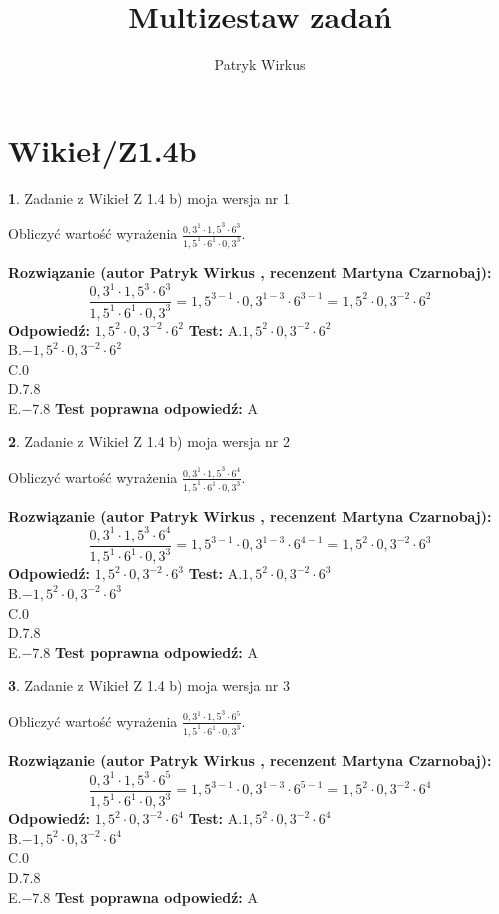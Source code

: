 \documentclass[12pt, a4paper]{article}
\title{Multizestaw zadań}
\author{Patryk Wirkus}
\date{}
\theoremstyle{definition} %
\newtheorem{zad}{}
\newcommand{\kategoria}[1]{\section{#1}}
\newcommand{\zadStart}[1]{\begin{zad}#1\newline}
\newcommand{\zadStop}{\end{zad}}
\newcommand{\rozwStart}[2]{\noindent \textbf{Rozwiązanie (autor #1 , recenzent #2): }\newline}
\newcommand{\rozwStop}{\newline}
\newcommand{\odpStart}{\noindent \textbf{Odpowiedź:}\newline}
\newcommand{\odpStop}{\newline}
\newcommand{\testStart}{\noindent \textbf{Test:}\newline}
\newcommand{\testStop}{\newline}
\newcommand{\kluczStart}{\noindent \textbf{Test poprawna odpowiedź:}\newline}
\newcommand{\kluczStop}{\newline}
\begin{document}
\maketitle

\kategoria{Wikieł/Z1.4b}


\zadStart{Zadanie z Wikieł Z 1.4 b) moja wersja nr 1}

Obliczyć wartość wyrażenia $\frac{0,3^{1}\cdot1,5^{3}\cdot6^{3}}{1,5^{1}\cdot6^{1}\cdot0,3^{3}}$.
\zadStop
\rozwStart{Patryk Wirkus}{Martyna Czarnobaj}
$$\frac{0,3^{1}\cdot1,5^{3}\cdot6^{3}}{1,5^{1}\cdot6^{1}\cdot0,3^{3}} = 1,5^{3-1} \cdot 0,3^{1-3} \cdot 6^{3-1} = 1,5^{2} \cdot 0,3^{-2} \cdot 6^{2}$$
\rozwStop
\odpStart
$1,5^{2} \cdot 0,3^{-2} \cdot 6^{2}$
\odpStop
\testStart
A.$1,5^{2} \cdot 0,3^{-2} \cdot 6^{2}$\\ B.$-1,5^{2} \cdot 0,3^{-2} \cdot 6^{2}$\\ C.$0$\\ D.$7.8$\\ E.$-7.8$
\testStop
\kluczStart
A
\kluczStop



\zadStart{Zadanie z Wikieł Z 1.4 b) moja wersja nr 2}

Obliczyć wartość wyrażenia $\frac{0,3^{1}\cdot1,5^{3}\cdot6^{4}}{1,5^{1}\cdot6^{1}\cdot0,3^{3}}$.
\zadStop
\rozwStart{Patryk Wirkus}{Martyna Czarnobaj}
$$\frac{0,3^{1}\cdot1,5^{3}\cdot6^{4}}{1,5^{1}\cdot6^{1}\cdot0,3^{3}} = 1,5^{3-1} \cdot 0,3^{1-3} \cdot 6^{4-1} = 1,5^{2} \cdot 0,3^{-2} \cdot 6^{3}$$
\rozwStop
\odpStart
$1,5^{2} \cdot 0,3^{-2} \cdot 6^{3}$
\odpStop
\testStart
A.$1,5^{2} \cdot 0,3^{-2} \cdot 6^{3}$\\ B.$-1,5^{2} \cdot 0,3^{-2} \cdot 6^{3}$\\ C.$0$\\ D.$7.8$\\ E.$-7.8$
\testStop
\kluczStart
A
\kluczStop



\zadStart{Zadanie z Wikieł Z 1.4 b) moja wersja nr 3}

Obliczyć wartość wyrażenia $\frac{0,3^{1}\cdot1,5^{3}\cdot6^{5}}{1,5^{1}\cdot6^{1}\cdot0,3^{3}}$.
\zadStop
\rozwStart{Patryk Wirkus}{Martyna Czarnobaj}
$$\frac{0,3^{1}\cdot1,5^{3}\cdot6^{5}}{1,5^{1}\cdot6^{1}\cdot0,3^{3}} = 1,5^{3-1} \cdot 0,3^{1-3} \cdot 6^{5-1} = 1,5^{2} \cdot 0,3^{-2} \cdot 6^{4}$$
\rozwStop
\odpStart
$1,5^{2} \cdot 0,3^{-2} \cdot 6^{4}$
\odpStop
\testStart
A.$1,5^{2} \cdot 0,3^{-2} \cdot 6^{4}$\\ B.$-1,5^{2} \cdot 0,3^{-2} \cdot 6^{4}$\\ C.$0$\\ D.$7.8$\\ E.$-7.8$
\testStop
\kluczStart
A
\kluczStop
\end{document}
